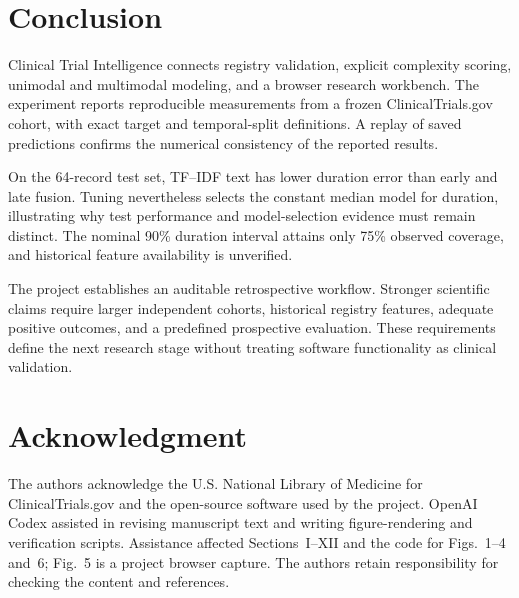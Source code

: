 \documentclass[10pt,letterpaper,twocolumn]{article}
\begin{document}
\section{Conclusion}

Clinical Trial Intelligence connects registry validation, explicit complexity scoring, unimodal and multimodal modeling, and a browser research workbench. The experiment reports reproducible measurements from a frozen ClinicalTrials.gov cohort, with exact target and temporal-split definitions. A replay of saved predictions confirms the numerical consistency of the reported results.

On the 64-record test set, TF--IDF text has lower duration error than early and late fusion. Tuning nevertheless selects the constant median model for duration, illustrating why test performance and model-selection evidence must remain distinct. The nominal 90\% duration interval attains only 75\% observed coverage, and historical feature availability is unverified.

The project establishes an auditable retrospective workflow. Stronger scientific claims require larger independent cohorts, historical registry features, adequate positive outcomes, and a predefined prospective evaluation. These requirements define the next research stage without treating software functionality as clinical validation.

\section*{Acknowledgment}

The authors acknowledge the U.S. National Library of Medicine for ClinicalTrials.gov and the open-source software used by the project. OpenAI Codex assisted in revising manuscript text and writing figure-rendering and verification scripts. Assistance affected Sections~I--XII and the code for Figs.~1--4 and~6; Fig.~5 is a project browser capture. The authors retain responsibility for checking the content and references.
\end{document}
